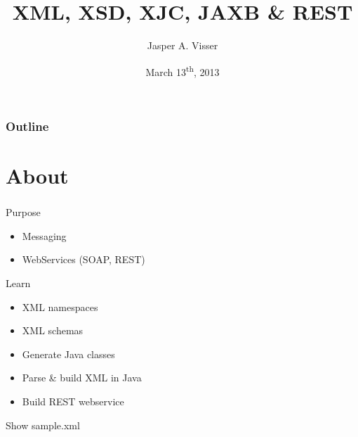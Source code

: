 \documentclass[handout]{beamer}
\title[XML]{XML, XSD, XJC, JAXB \& REST}
\author[Jasper A. Visser]{Jasper A. Visser}
\institute[Portavita]{Portavita BV}
\date{March 13\textsuperscript{th}, 2013}
\begin{document}
\begin{frame}
	\inserttitlegraphic
	\vspace{5mm}
	\titlepage
\end{frame}

\begin{frame}
	\frametitle{Outline}
	\tableofcontents
\end{frame}

\section*{About}
\begin{frame}
	\frametitle{\insertsection}
	\begin{block}{Purpose}
		\begin{itemize}
			\item Messaging
			\item WebServices (SOAP, REST)
		\end{itemize}
	\end{block}
	\begin{block}{Learn}
		\begin{itemize}
			\item XML namespaces
			\item XML schemas
			\item Generate Java classes
			\item Parse \& build XML in Java
			\item Build REST webservice
		\end{itemize}
	\end{block}
	\begin{semiverbatim}
		Show sample.xml
	\end{semiverbatim}
\end{frame}

\end{document}

